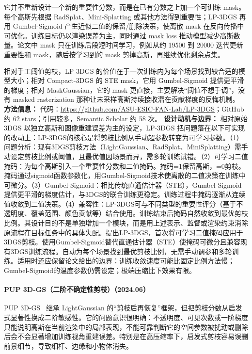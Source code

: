 它并不重新设计一个新的重要性分数，而是在已有分数之上加一个可训练 mask。每个高斯先根据 RadSplat、Mini-Splatting 或其他方法得到重要性；LP-3DGS 再用 Gumbel-Sigmoid 产生近似二值的保留/删除决策，使离散 mask 在反向传播中可优化。训练目标仍以渲染误差为主，同时通过 mask loss 推动模型减少高斯数量。论文中 mask 只在训练后段短时间学习，例如从约 19500 到 20000 迭代更新重要性和 mask，随后按学习到的 mask 剪掉高斯，再继续优化剩余点集。

相对手工阈值剪枝，LP-3DGS 的价值在于一次训练内为每个场景找到较合适的模型大小；相对 Compact-3DGS 的 STE mask，它用 Gumbel-Sigmoid 提供更平滑的梯度；相对 MaskGaussian，它的 mask 更直接，主要解决“阈值不想手调”，没有 masked rasterization 那种让未采样高斯持续接收潜在贡献梯度的反悔机制。
\textbf{方法信息：} 代码：\url{https://github.com/ASU-ESIC-FAN-Lab/LP-3DGS}；GitHub 约 62 stars；引用较多，Semantic Scholar 约 58 次。
\textbf{设计动机与边界：} 相对原始 3DGS 以独立高斯和图像重建误差为主的设定，LP-3DGS 把问题落在以下可实现的改动上：LP-3DGS的核心是将剪枝比例从手动超参数转变为可学习参数。（1）问题分析：现有3DGS剪枝方法（LightGaussian、RadSplat、MiniSplatting）需手动设定剪枝比例或阈值，且最优值因场景而异，需多轮训练试错。（2）可学习二值掩码：为每个高斯引入一个重要性分数和二值掩码。掩码=1保留高斯，=0剪枝。掩码通过sigmoid函数参数化，用Gumbel-Sigmoid技术使离散的二值决策在训练中可微分。（3）Gumbel-Sigmoid：相比传统直通估计器（STE），Gumbel-Sigmoid提供更平滑的梯度估计，与3DGS的联合训练更稳定。训练过程中掩码逐渐从连续值收敛到二值决策。（4）兼容性：LP-3DGS可与不同类型的重要性评分（基于不透明度、覆盖范围、颜色贡献等）结合使用。训练结束后掩码自然收敛到最优剪枝比例。其设计目的不是单独增加一个模块，而是用上述表示、监督或渲染约束消除原流程在目标任务中的具体失配。提出LP-3DGS，首次将可学习二值掩码应用于3DGS剪枝。使用Gumbel-Sigmoid替代直通估计器（STE）使掩码可微分且兼容现有3DGS训练流程。自动为每个场景找到最优剪枝比例，无需手动调参和多轮训练。适用时还应保留论文给出的边界：训练收敛速度可能比固定比例方法慢；Gumbel-Sigmoid的温度参数仍需设定；极端压缩比下效果有限。
\paragraph{PUP 3D-GS（二阶不确定性剪枝）（2024.06）}
PUP 3D-GS~\cite{2406_10219} 继承 LightGaussian 的“剪枝后再恢复”框架，但把剪枝分数从启发式显著性换成二阶敏感性。它的问题意识很明确：不透明度、可见次数或一阶梯度只能说明高斯在当前渲染中的局部表现，不能可靠判断它的空间参数被扰动或删除后会不会显著增加训练视角重建误差。特别是在高压缩率下，启发式剪枝容易误删前景细节，导致细杆、边缘和小物体消失。

